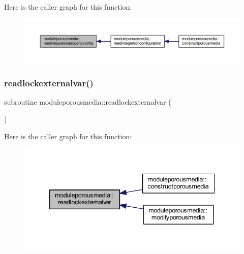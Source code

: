 Here is the caller graph for this function\+:\nopagebreak
\begin{figure}[H]
\begin{center}
\leavevmode
\includegraphics[width=350pt]{namespacemoduleporousmedia_af773f6dce68c6222d17ca3f4fe88192d_icgraph}
\end{center}
\end{figure}
\mbox{\label{namespacemoduleporousmedia_acfd0df7c0db51fe2a9c3ab697d07b548}} 
\subsubsection{\texorpdfstring{readlockexternalvar()}{readlockexternalvar()}}
{\footnotesize\ttfamily subroutine moduleporousmedia\+::readlockexternalvar (\begin{DoxyParamCaption}{ }\end{DoxyParamCaption})\hspace{0.3cm}{\ttfamily [private]}}

Here is the caller graph for this function\+:\nopagebreak
\begin{figure}[H]
\begin{center}
\leavevmode
\includegraphics[width=339pt]{namespacemoduleporousmedia_acfd0df7c0db51fe2a9c3ab697d07b548_icgraph}
\end{center}
\end{figure}
\mbox{\label{namespacemoduleporousmedia_ab8846ea02c912ad7abc75b7736e11552}} 
